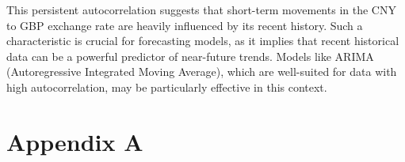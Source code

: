 \documentclass{article}\usepackage[]{graphicx}\usepackage[]{xcolor}
\begin{document}
\noindent
This persistent autocorrelation suggests that short-term movements in the CNY to GBP exchange rate are heavily influenced by its recent history. Such a characteristic is crucial for forecasting models, as it implies that recent historical data can be a powerful predictor of near-future trends. Models like ARIMA (Autoregressive Integrated Moving Average), which are well-suited for data with high autocorrelation, may be particularly effective in this context.



\newpage

 
\newpage

\appendix
\section{Appendix A}
\end{document}
